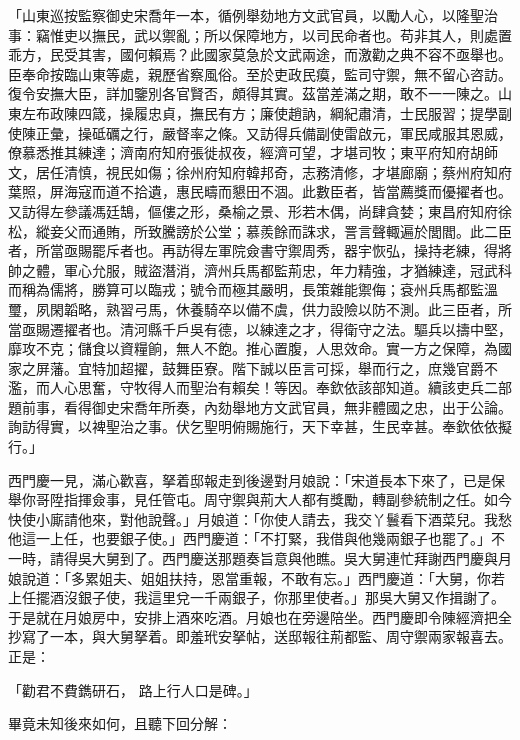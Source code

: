 「山東巡按監察御史宋喬年一本，循例舉劾地方文武官員，以勵人心，以隆聖治事：竊惟吏以撫民，武以禦亂；所以保障地方，以司民命者也。苟非其人，則處置乖方，民受其害，國何賴焉？此國家莫急於文武兩途，而激勸之典不容不亟舉也。臣奉命按臨山東等處，親歷省察風俗。至於吏政民瘼，監司守禦，無不留心咨訪。復令安撫大臣，詳加鑒別各官賢否，頗得其實。茲當差滿之期，敢不一一陳之。山東左布政陳四箴，操履忠貞，撫民有方；廉使趙訥，綱紀肅清，士民服習；提學副使陳正彙，操砥礪之行，嚴督率之條。又訪得兵備副使雷啟元，軍民咸服其恩威，僚慕悉推其練達；濟南府知府張徙叔夜，經濟可望，才堪司牧；東平府知府胡師文，居任清慎，視民如傷；徐州府知府韓邦奇，志務清修，才堪廊廟；蔡州府知府葉照，屏海寇而道不拾遺，惠民疇而懇田不涸。此數臣者，皆當薦獎而優擢者也。又訪得左參議馮廷鵠，傴僂之形，桑榆之景、形若木偶，尚肆貪婪；東昌府知府徐松，縱妾父而通賄，所致騰謗於公堂；慕羨餘而誅求，詈言聲輙遍於閭閻。此二臣者，所當亟賜罷斥者也。再訪得左軍院僉書守禦周秀，器宇恢弘，操持老練，得將帥之體，軍心允服，賊盜潛消，濟州兵馬都監荊忠，年力精強，才猶練達，冠武科而稱為儒將，勝算可以臨戎；號令而極其嚴明，長策雜能禦侮；袞州兵馬都監溫璽，夙閑韜略，熟習弓馬，休養騎卒以備不虞，供力設險以防不測。此三臣者，所當亟賜遷擢者也。清河縣千戶吳有德，以練達之才，得衛守之法。驅兵以擣中堅，靡攻不克；儲食以資糧餉，無人不飽。推心置腹，人思效命。實一方之保障，為國家之屏藩。宜特加超擢，鼓舞臣寮。階下誠以臣言可採，舉而行之，庶幾官爵不濫，而人心思奮，守牧得人而聖治有賴矣！等因。奉欽依該部知道。續該吏兵二部題前事，看得御史宋喬年所奏，內劾舉地方文武官員，無非體國之忠，出于公論。詢訪得實，以裨聖治之事。伏乞聖明俯賜施行，天下幸甚，生民幸甚。奉欽依依擬行。」

西門慶一見，滿心歡喜，拏着邸報走到後邊對月娘說：「宋道長本下來了，已是保舉你哥陞指揮僉事，見任管屯。周守禦與荊大人都有獎勵，轉副參統制之任。如今快使小廝請他來，對他說聲。」月娘道：「你使人請去，我交丫鬟看下酒菜兒。我愁他這一上任，也要銀子使。」西門慶道：「不打緊，我借與他幾兩銀子也罷了。」不一時，請得吳大舅到了。西門慶送那題奏旨意與他瞧。吳大舅連忙拜謝西門慶與月娘說道：「多累姐夫、姐姐扶持，恩當重報，不敢有忘。」西門慶道：「大舅，你若上任擺酒沒銀子使，我這里兌一千兩銀子，你那里使者。」那吳大舅又作揖謝了。于是就在月娘房中，安排上酒來吃酒。月娘也在旁邊陪坐。西門慶即令陳經濟把全抄寫了一本，與大舅拏着。即羞玳安拏帖，送邸報往荊都監、周守禦兩家報喜去。正是：

「勸君不費鐫研石，  路上行人口是碑。」

畢竟未知後來如何，且聽下回分解：


